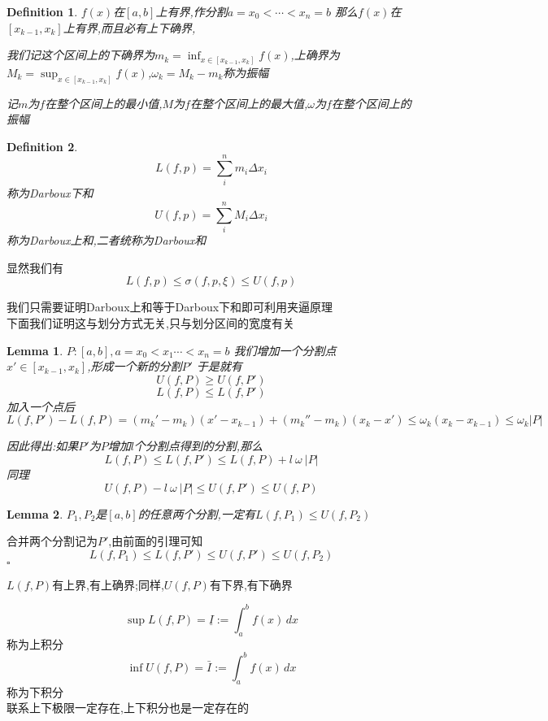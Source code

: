 \documentclass[11pt,hyperref,a4paper,UTF8]{ctexart}
\newtheorem{lemma}{Lemma}[subsection]
\newtheorem{definition}{Definition}[subsection]
\newenvironment{cproof}{%
\heiti{证明}\kaishu
}{%
  \hfill $\square$
  \par\bigskip
}
\begin{document}
\begin{CJK}{UTF8}{gkai}
\begin{definition}
  $f(x)$在$[a,b]$上有界,作分割$a = x_0 < \cdots < x_n = b$
  那么$f(x)$在$[x_{k - 1},x_k]$上有界,而且必有上下确界,
  
  我们记这个区间上的下确界为$m_k = \inf_{x\in[x_{k - 1},x_k]}f(x)$,上确界为$M_k = \sup_{x\in[x_{k - 1},x_k]}f(x)$,$\omega_k = M_k - m_k$称为振幅
  
  记$m$为$f$在整个区间上的最小值,$M$为$f$在整个区间上的最大值,$\omega$为$f$在整个区间上的振幅    
\end{definition}

\begin{definition}
\[L(f,p) = \sum_{i}^{n}m_i \Delta x_i\]
称为Darboux下和
\[U(f,p) = \sum_{i}^{n}M_i \Delta x_i\]
称为Darboux上和,二者统称为Darboux和
\end{definition}
显然我们有
\[L(f,p) \leq \sigma(f,p,\xi) \leq U(f,p)\]

我们只需要证明Darboux上和等于Darboux下和即可利用夹逼原理\\

下面我们证明这与划分方式无关,只与划分区间的宽度有关

\begin{lemma}
  $P:[a,b], a = x_0 < x_1 \cdots < x_n = b$
  我们增加一个分割点$x'\in[x_{k - 1},x_{k}]$,形成一个新的分割$P'$
于是就有
  \[U(f,P) \geq U(f,P')\]
  \[L(f,P) \leq L(f,P')\]
  加入一个点后
  \[L(f,P') - L(f,P) = (m_k' - m_k)(x' - x_{k - 1}) + (m_k'' - m_k)(x_{k} - x') \leq \omega_k(x_k - x_{k - 1}) \leq \omega_k |P|\]

  因此得出:如果$P'$为$P$增加$l$个分割点得到的分割,那么\[L(f,P) \leq L(f,P') \leq L(f,P) + l ~\omega~|P|\]
  同理\[U(f,P)  - l~ \omega~|P|\leq U(f,P') \leq U(f,P)\]
\end{lemma}

\begin{lemma}
  $P_1,P_2$是$[a,b]$的任意两个分割,一定有$L(f,P_1)\leq U(f,P_2)$\\
\end{lemma}

\begin{cproof}
  合并两个分割记为$P'$,由前面的引理可知
  \[L(f,P_1)\leq L(f,P') \leq U(f,P')\leq U(f,P_2)\]
\end{cproof}

$L(f,P)$有上界,有上确界;同样,$U(f,P)$有下界,有下确界

\[\sup L(f,P) = \underline{I} := \int_{a}^{b}f(x)\, dx\]称为上积分\\
\[\inf U(f,P) = \bar{I} := \int_{a}^{b}f(x)\, dx\]称为下积分\\
联系上下极限一定存在,上下积分也是一定存在的\\


\end{CJK}
\end{document}
